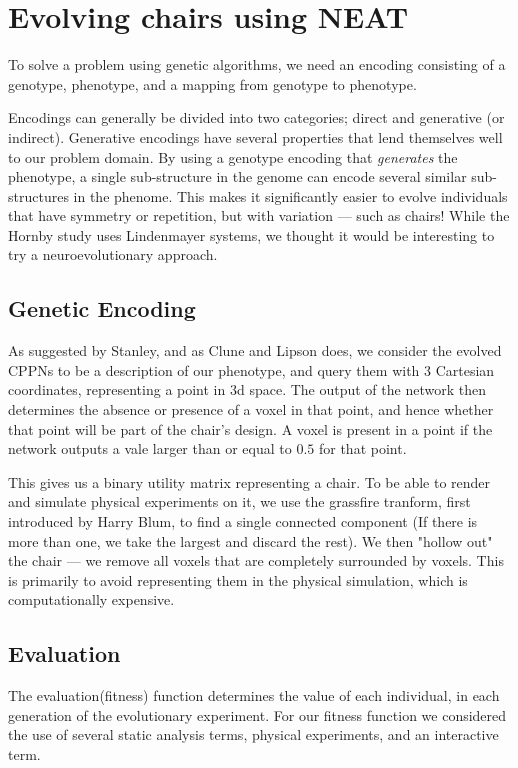 \section{Evolving chairs using NEAT}
To solve a problem using genetic algorithms, we need an encoding
consisting of a genotype, phenotype, and a mapping from genotype to phenotype.

Encodings can generally be divided into two categories; direct and generative
(or indirect). Generative encodings have several properties that lend themselves
well to our problem domain. By using a genotype encoding that \emph{generates}
the phenotype, a single sub-structure in the genome can encode several similar
sub-structures in the phenome. This makes it significantly easier to evolve
individuals that have symmetry or repetition, but with variation --- such as
chairs! While the Hornby study\cite{paper:ev4} uses Lindenmayer
systems\cite{Hornby2003}, we thought it would be interesting to try a
neuroevolutionary approach.

\subsection{Genetic Encoding}
As suggested by Stanley\cite{Stanley2007}, and as Clune and
Lipson\cite{Clune:2011:EOG:2078245.2078246} does, we consider the evolved CPPNs
to be a description of our phenotype, and query them with 3 Cartesian
coordinates, representing a point in 3d space. The output of the network then
determines the absence or presence of a voxel in that point, and hence whether
that point will be part of the chair's design. A voxel is present in a point if
the network outputs a vale larger than or equal to $0.5$ for that point.

This gives us a binary utility matrix representing a chair. To be able to render
and simulate physical experiments on it, we use the grassfire tranform, first
introduced by Harry Blum\cite{blum67}, to find a single connected component (If
there is more than one, we take the largest and discard the rest). We then
"hollow out" the chair --- we remove all voxels that are completely surrounded by
voxels. This is primarily to avoid representing them in the physical simulation,
which is computationally expensive.

\subsection{Evaluation}
The evaluation(fitness) function determines the value of each individual, in
each generation of the evolutionary experiment. For our fitness function we
considered the use of several static analysis terms, physical experiments, and
an interactive term.

